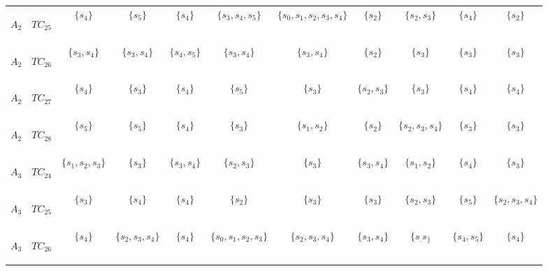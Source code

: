 \begin{table}[htp]
\begin{center}
\begin{tabular}{|cc|c|c|c|c|c|c|c|c|c|}
\begin{scriptsize}$A_2$\end{scriptsize} & \begin{scriptsize}$TC_{25}$\end{scriptsize} & $\{s_4\}$ & $\{s_5\}$ & $\{s_4\}$ & $\{s_3, s_4, s_5\}$ & $\{s_0, s_1, s_2, s_3, s_4\}$ & $\{s_2\}$ & $\{s_2, s_3\}$ & $\{s_4\}$ & $\{s_2\}$\\
\begin{scriptsize}$A_2$\end{scriptsize} & \begin{scriptsize}$TC_{26}$\end{scriptsize} & $\{s_3, s_4\}$ & $\{s_3, s_4\}$ & $\{s_4, s_5\}$ & $\{s_3, s_4\}$ & $\{s_3, s_4\}$ & $\{s_2\}$ & $\{s_3\}$ & $\{s_3\}$ & $\{s_3\}$\\
\begin{scriptsize}$A_2$\end{scriptsize} & \begin{scriptsize}$TC_{27}$\end{scriptsize} & $\{s_4\}$ & $\{s_3\}$ & $\{s_4\}$ & $\{s_5\}$ & $\{s_3\}$ & $\{s_2, s_3\}$ & $\{s_3\}$ & $\{s_4\}$ & $\{s_4\}$\\
\begin{scriptsize}$A_2$\end{scriptsize} & \begin{scriptsize}$TC_{28}$\end{scriptsize} & $\{s_5\}$ & $\{s_5\}$ & $\{s_4\}$ & $\{s_3\}$ & $\{s_1, s_2\}$ & $\{s_2\}$ & $\{s_2, s_3, s_4\}$ & $\{s_3\}$ & $\{s_3\}$\\
\begin{scriptsize}$A_3$\end{scriptsize} & \begin{scriptsize}$TC_{24}$\end{scriptsize} & $\{s_1, s_2, s_3\}$ & $\{s_3\}$ & $\{s_3, s_4\}$ & $\{s_2, s_3\}$ & $\{s_3\}$ & $\{s_3, s_4\}$ & $\{s_1, s_2\}$ & $\{s_4\}$ & $\{s_3\}$\\
\begin{scriptsize}$A_3$\end{scriptsize} & \begin{scriptsize}$TC_{25}$\end{scriptsize} & $\{s_3\}$ & $\{s_4\}$ & $\{s_4\}$ & $\{s_2\}$ & $\{s_3\}$ & $\{s_3\}$ & $\{s_2, s_3\}$ & $\{s_5\}$ & $\{s_2, s_3, s_4\}$\\
\begin{scriptsize}$A_3$\end{scriptsize} & \begin{scriptsize}$TC_{26}$\end{scriptsize} & $\{s_4\}$ & $\{s_2, s_3, s_4\}$ & $\{s_4\}$ & $\{s_0, s_1, s_2, s_3\}$ & $\{s_2, s_3, s_4\}$ & $\{s_3, s_4\}$ & $\{s_, s_\}$ & $\{s_4, s_5\}$ & $\{s_4\}$\\

\end{tabular}
\end{center}
\end{table}

